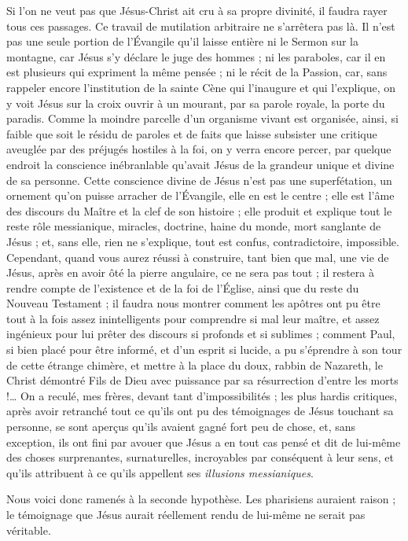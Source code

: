 Si l’on ne veut pas que Jésus-Christ ait cru à sa propre divinité, il faudra rayer tous ces passages. Ce travail de mutilation arbitraire ne s’arrêtera pas là. Il n’est pas une seule portion de l’Évangile qu’il laisse entière\frcolon{} ni le Sermon sur la montagne, car Jésus s’y déclare le juge des hommes ; ni les paraboles, car il en est plusieurs qui expriment la même pensée ; ni le récit de la Passion, car, sans rappeler encore l’institution de la sainte Cène qui l’inaugure et qui l’explique, on y voit Jésus sur la croix ouvrir à un mourant, par sa parole royale, la porte du paradis. Comme la moindre parcelle d’un organisme vivant est organisée, ainsi, si faible que soit le résidu de paroles et de faits que laisse subsister une critique aveuglée par des préjugés hostiles à la foi, on y verra encore percer, par quelque endroit la conscience inébranlable qu’avait Jésus de la grandeur unique et divine de sa personne. Cette conscience divine de Jésus n’est pas une superfétation, un ornement qu’on puisse arracher de l’Évangile, elle en est le centre ; elle est l’âme des discours du Maître et la clef de son histoire ; elle produit et explique tout le reste\frcolon{} rôle messianique, miracles, doctrine, haine du monde, mort sanglante de Jésus ; et, sans elle, rien ne s’explique, tout est confus, contradictoire, impossible. Cependant, quand vous aurez réussi à construire, tant bien que mal, une vie de Jésus, après en avoir ôté la pierre angulaire, ce ne sera pas tout ; il restera à rendre compte de l’existence et de la foi de l’Église, ainsi que du reste du Nouveau Testament ; il faudra nous montrer comment les apôtres ont pu être tout à la fois assez inintelligents pour comprendre si mal leur maître, et assez ingénieux pour lui prêter des discours si profonds et si sublimes ; comment Paul, si bien placé pour être informé, et d’un esprit si lucide, a pu s’éprendre à son tour de cette étrange chimère, et mettre à la place du doux, rabbin de Nazareth, le Christ démontré Fils de Dieu avec puissance par sa résurrection d’entre les morts !… On a reculé, mes frères, devant tant d’impossibilités ; les plus hardis critiques, après avoir retranché tout ce qu’ils ont pu des témoignages de Jésus touchant sa personne, se sont aperçus qu’ils avaient gagné fort peu de chose, et, sans exception, ils ont fini par avouer que Jésus a en tout cas pensé et dit de lui-même des choses surprenantes, surnaturelles, incroyables par conséquent à leur sens, et qu’ils attribuent à ce qu’ils appellent ses \emph{illusions messianiques}.

Nous voici donc ramenés à la seconde hypothèse. Les pharisiens auraient raison ; le témoignage que Jésus aurait réellement rendu de lui-même ne serait pas véritable.

